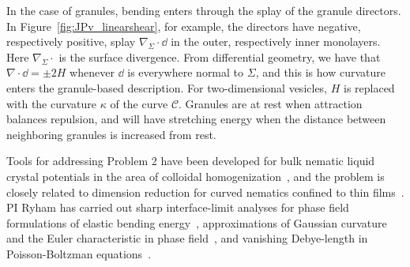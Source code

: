 In the case of granules, bending enters through the splay of the granule
directors. In Figure~\ref{fig:JPv_linearshear}, for example, the
directors have negative, respectively positive, splay $\nabla_{\Sigma}
\cdot \dd$ in the outer, respectively inner monolayers. Here
$\nabla_{\Sigma}\cdot{}$ is the surface divergence. From differential
geometry, we have that $\nabla\cdot \dd = \pm 2H$ whenever $\dd$ is
everywhere normal to $\Sigma$, and this is how curvature enters the
granule-based description. For two-dimensional vesicles, $H$ is replaced
with the curvature $\kappa$ of the curve $\mathcal{C}$. Granules are at
rest when attraction balances repulsion, and will have stretching energy
when the distance between neighboring granules is increased from rest.

Tools for addressing Problem 2 have been developed for bulk nematic
liquid crystal potentials in the area of colloidal
homogenization~\cite{Canevari2019DesignOE, doi:10.1137/18M1163919,
BERLYAND200597, doi:10.1137/130910348}, and the problem is closely
related to dimension reduction for curved nematics confined to thin
films~\cite{Golovaty2017DimensionRF, Golovaty2015DimensionRF,
doi:10.1142/S0218202516500470, FoFrLe07}. PI Ryham has carried out sharp
interface-limit analyses for phase field formulations of elastic bending
energy~\cite{0951-7715-18-3-016, Du05}, approximations of Gaussian
curvature and the Euler characteristic in phase field~\cite{DuEuler},
and vanishing Debye-length in Poisson-Boltzman equations~\cite{Lee2018,
1531-3492_2006_2_357}.


